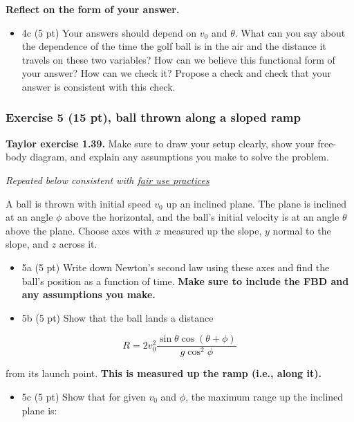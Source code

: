 \documentclass[11pt]{article}
\providecommand{\tightlist}{%
      \setlength{\itemsep}{0pt}\setlength{\parskip}{0pt}}
\begin{document}
\textbf{Reflect on the form of your answer.}

\begin{itemize}
\tightlist
\item
  4c (5 pt) Your answers should depend on \(v_0\) and \(\theta\). What
  can you say about the dependence of the time the golf ball is in the
  air and the distance it travels on these two variables? How can we
  believe this functional form of your answer? How can we check it?
  Propose a check and check that your answer is consistent with this
  check.
\end{itemize}

    \subsubsection{Exercise 5 (15 pt), ball thrown along a sloped
ramp}\label{exercise-5-15-pt-ball-thrown-along-a-sloped-ramp}

\textbf{Taylor exercise 1.39.} Make sure to draw your setup clearly,
show your free-body diagram, and explain any assumptions you make to
solve the problem.

\emph{Repeated below consistent with
\href{https://en.wikipedia.org/wiki/Fair_use}{fair use practices}}

A ball is thrown with initial speed \(v_0\) up an inclined plane. The
plane is inclined at an angle \(\phi\) above the horizontal, and the
ball's initial velocity is at an angle \(\theta\) above the plane.
Choose axes with \(x\) measured up the slope, \(y\) normal to the slope,
and \(z\) across it.

\begin{itemize}
\tightlist
\item
  5a (5 pt) Write down Newton's second law using these axes and find the
  ball's position as a function of time. \textbf{Make sure to include
  the FBD and any assumptions you make.}
\item
  5b (5 pt) Show that the ball lands a distance
\end{itemize}

\[R=2v_0^2\dfrac{\sin\theta\cos\left(\theta + \phi\right)}{g \cos^2 \phi}\]

from its launch point. \textbf{This is measured up the ramp (i.e., along
it).}

\begin{itemize}
\tightlist
\item
  5c (5 pt) Show that for given \(v_0\) and \(\phi\), the maximum range
  up the inclined plane is:
\end{itemize}
\end{document}
